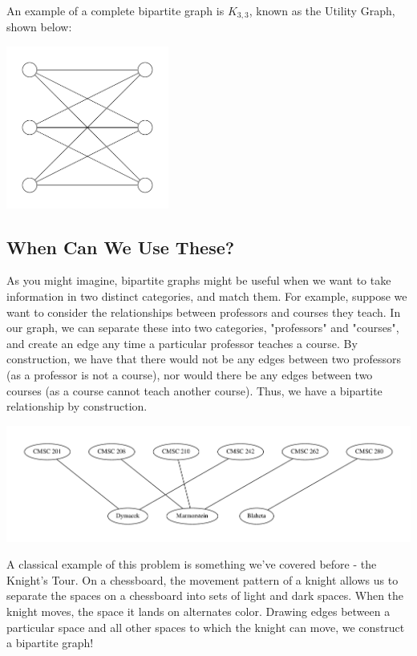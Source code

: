 An example of a complete bipartite graph is $K_{3,3}$, known as the Utility Graph, shown below:

\begin{center}
    \includegraphics[width=0.4\textwidth]{Project3/Bipartite/k33.pdf}
\end{center}

\subsection{When Can We Use These?}
As you might imagine, bipartite graphs might be useful when we want to take information in two distinct categories, and match them. For example, suppose we want to consider the relationships between professors and courses they teach. In our graph, we can separate these into two categories, "professors" and "courses", and create an edge any time a particular professor teaches a course. By construction, we have that there would not be any edges between two professors (as a professor is not a course), nor would there be any edges between two courses (as a course cannot teach another course). Thus, we have a bipartite relationship by construction.

\begin{center}
    \includegraphics[width=\textwidth]{Project3/Bipartite/boxed.pdf}
\end{center}

A classical example of this problem is something we've covered before - the Knight's Tour. On a chessboard, the movement pattern of a knight allows us to separate the spaces on a chessboard into sets of light and dark spaces. When the knight moves, the space it lands on alternates color. Drawing edges between a particular space and all other spaces to which the knight can move, we construct a bipartite graph!

